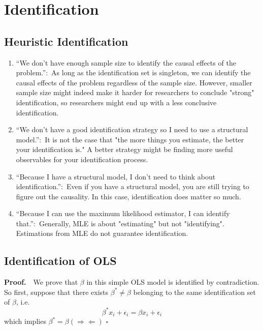 \documentclass[12pt]{article}
\newcommand*{\QEDA}{\null\nobreak\hfill\ensuremath{\square}}%
\begin{document}
\section{Identification}
\subsection{Heuristic Identification} \label{Heuristic}
\begin{enumerate}
    \item “We don’t have enough sample size to identify the causal effects of the problem.”:\ As long as the identification set is singleton, we can identify the causal effects of the problem regardless of the sample size.
          However, smaller sample size might indeed make it harder for researchers to conclude "strong" identification, so researchers might end up with a less conclusive identification.
    \item “We don’t have a good identification strategy so I need to use a structural model.”:\ It is not the case that "the more things you estimate, the better your identification is."
          A better strategy might be finding more useful observables for your identification process.
    \item “Because I have a structural model, I don’t need to think about identification.”:\ Even if you have a structural model, you are still trying to figure out the causality. In this case, identification does matter so much.
    \item “Because I can use the maximum likelihood estimator, I can identify that.”:\ Generally, MLE is about "estimating" but not "identifying". Estimations from MLE do not guarantee identification.
\end{enumerate}

\subsection{Identification of OLS} \label{OLS}
\textbf{Proof.}\ \ We prove that $\beta$ in this simple OLS model is identified by contradiction. 
So first, suppose that there exists $\beta^* \neq \beta$ belonging to the same identification set of $\beta$, 
i.e. $$\beta^* x_i + \epsilon_i = \beta x_i + \epsilon_i$$
which implies $\beta^* = \beta (\Rightarrow \Leftarrow )$ \QEDA
\end{document}
